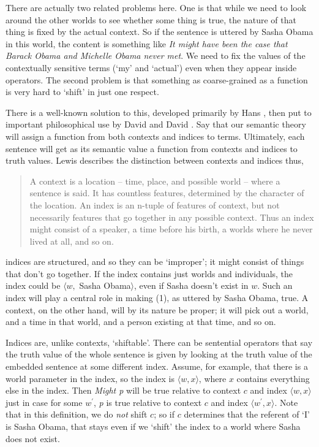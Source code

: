 There are actually two related problems here. One is that while we need to look around the other worlds to see whether some thing is true, the nature of that thing is fixed by the actual context. So if the sentence is uttered by Sasha Obama in this world, the content is something like \emph{It might have been the case that Barack Obama and Michelle Obama never met}. We need to fix the values of the contextually sensitive terms (`my' and `actual') even when they appear inside operators. The second problem is that something as coarse-grained as a function is very hard to `shift' in just one respect. 

There is a well-known solution to this, developed primarily by Hans  \citet{Kamp1971}, then put to important philosophical use by David  \citet{Lewis1980b} and David  \citet{Kaplan1977}. Say that our semantic theory will assign a function from both contexts and indices to terms. Ultimately, each sentence will get as its semantic value a function from contexts and indices to truth values. Lewis describes the distinction between contexts and indices thus,

\begin{quote}

A context is a location – time, place, and possible world – where a sentence is said. It has countless features, determined by the character of the location. An index is an n-tuple of features of context, but not necessarily features that go together in any possible context. Thus an index might consist of a speaker, a time before his birth, a worlds where he never lived at all, and so on. ~\citep[79]{Lewis1980b}
\end{quote}
indices are structured, and so they can be `improper'; it might consist of things that don't go together. If the index contains just worlds and individuals, the index could be $\langle w,$ Sasha Obama$\rangle$, even if Sasha doesn't exist in $w$. Such an index will play a central role in making (1), as uttered by Sasha Obama, true. A context, on the other hand, will by its nature be proper; it will pick out a world, and a time in that world, and a person existing at that time, and so on.

Indices are, unlike contexts, `shiftable'. There can be sentential operators that say the truth value of the whole sentence is given by looking at the truth value of the embedded sentence at some different index. Assume, for example, that there is a world parameter in the index, so the index is $\langle w, x\rangle$, where $x$ contains everything else in the index. Then \emph{Might p} will be true relative to context $c$ and index $\langle w, x\rangle$ just in case for some $w^{\prime}$, \emph{p} is true relative to context $c$ and index $\langle w^{\prime}, x\rangle$. Note that in this definition, we do \emph{not} shift $c$; so if $c$ determines that the referent of `I' is Sasha Obama, that stays even if we `shift' the index to a world where Sasha does not exist.

